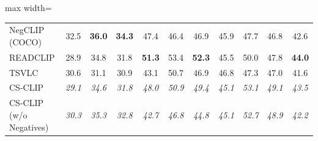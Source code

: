\begin{table}[t]
\begin{adjustbox}{max width=\textwidth}
\begin{tabular}{p{5cm}ccc|ccc|ccc|c}
    NegCLIP (COCO) & 32.5 & \textbf{36.0} & \textbf{34.3} & 47.4 & 46.4 & 46.9 & 45.9 & 47.7 & 46.8 & 42.6 \\
    READCLIP & 28.9 & 34.8 & 31.8 & \textbf{51.3} & 53.4 & \textbf{52.3} & 45.5 & 50.0 & 47.8 & \textbf{44.0} \\
    TSVLC & 30.6 & 31.1 & 30.9 & 43.1 & 50.7 & 46.9 & 46.8 & 47.3 & 47.0 & 41.6 \\
    \midrule
    CS-CLIP & \emph{29.1} & \emph{34.6} & \emph{31.8} & \emph{48.0} & \emph{50.9} & \emph{49.4} & \emph{45.1} & \emph{53.1} & \emph{49.1} & \emph{43.5} \\
    CS-CLIP (w/o Negatives) & \emph{30.3} & \emph{35.3} & \emph{32.8} & \emph{42.7} & \emph{46.8} & \emph{44.8} & \emph{45.1} & \emph{52.7} & \emph{48.9} & \emph{42.2} \\
    \bottomrule
  \end{tabular}
  \end{adjustbox}
\end{table}